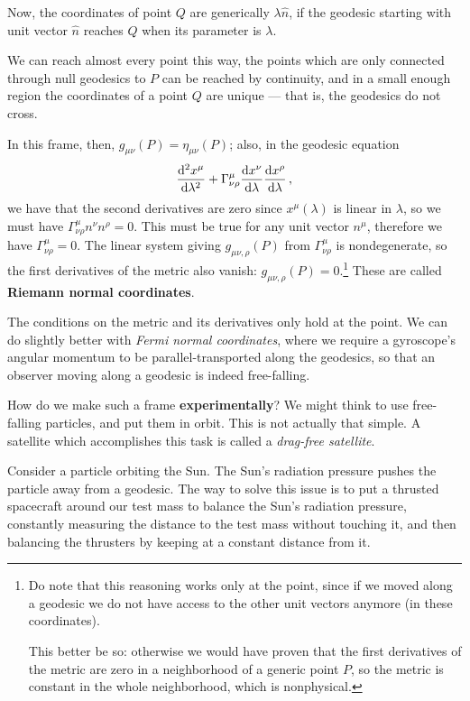\documentclass[main.tex]{subfiles}
\begin{document}
Now, the coordinates of point \(Q\) are generically \(\lambda \hat{n}\), if the geodesic starting with unit vector \(\hat{n}\) reaches \(Q\) when its parameter is \(\lambda \). 

We can reach almost every point this way, the points which are only connected through null geodesics to \(P\) can be reached by continuity, and in a small enough region the coordinates of a point \(Q\) are unique --- that is, the geodesics do not cross.

In this frame, then, \(g_{\mu \nu } (P) = \eta_{\mu \nu } (P)\); also, in the geodesic equation 
%
\begin{align}
\dv[2]{x^{\mu }}{\lambda } + \Gamma^{\mu }_{ \nu \rho } \dv{x^{\nu }}{\lambda } \dv{x^{\rho }}{\lambda }
\,,
\end{align}
%
we have that the second derivatives are zero since \(x^{\mu}(\lambda )\) is linear in \(\lambda \), so we must have \(\Gamma^{\mu }_{\nu \rho } n^{\nu } n^{\rho } = 0\).
This must be true for any unit vector \(n^{\mu }\), therefore we have \(\Gamma^{\mu }_{\nu \rho } =0 \).
The linear system giving \(g_{\mu \nu , \rho } (P) \) from \(\Gamma^{\mu }_{\nu \rho }\) is nondegenerate, so the first derivatives of the metric also vanish: \(g_{\mu \nu , \rho }(P) =0\).\footnote{Do note that this reasoning works only at the point, since if we moved along a geodesic we do not have access to the other unit vectors anymore (in these coordinates).

This better be so: otherwise we would have proven that the first derivatives of the metric are zero in a neighborhood of a generic point \(P\), so the metric is constant in the whole neighborhood, which is nonphysical.}
These are called \textbf{Riemann normal coordinates}. 

The conditions on the metric and its derivatives only hold at the point. We can do slightly better with \emph{Fermi normal coordinates}, where we require a gyroscope's angular momentum to be parallel-transported along the geodesics, so that an observer moving along a geodesic is indeed free-falling. 

How do we make such a frame \textbf{experimentally}? We might think to use free-falling particles, and put them in orbit. 
This is not actually that simple.
A satellite which accomplishes this task is called a \emph{drag-free satellite}. 

Consider a particle orbiting the Sun. 
The Sun's radiation pressure pushes the particle away from a geodesic. 
The way to solve this issue is to put a thrusted spacecraft around our test mass to balance the Sun's radiation pressure, constantly measuring the distance to the test mass without touching it, and then balancing the thrusters by keeping at a constant distance from it.
\end{document}
